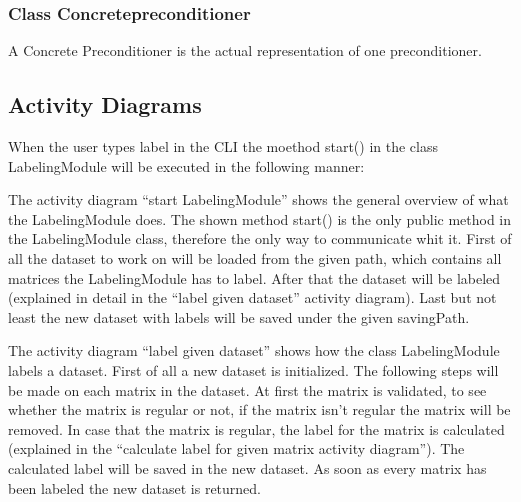 \documentclass[parskip=full]{scrartcl}
\begin{document}
\subsubsection{Class Concrete\gls{preconditioner}}
A Concrete Preconditioner is the actual representation of one \gls{preconditioner}.

\newpage
\subsection{Activity Diagrams}
When the user types label in the \gls{CLI} the moethod start() in the class LabelingModule will be executed in the following manner:

\begin{figure}[h]
\begin{center}

\label{Activity Diagrams}
\end{center}
\end{figure}
\newpage


The activity diagram ``start LabelingModule'' shows the general overview of what the LabelingModule does.
The shown method start() is the only public method in the LabelingModule class, therefore the only way to communicate whit it.
First of all the dataset to work on will be loaded from the given path, which contains all matrices the LabelingModule has to label.
After that the dataset will be labeled (explained in detail in the ``label given dataset'' activity diagram).
Last but not least the new dataset with \glspl{label} will be saved under the given savingPath.


\begin{figure}[h]
\begin{center}

\label{Activity Diagrams}
\end{center}
\end{figure}
\newpage


The activity diagram ``label given dataset'' shows how the class LabelingModule labels a dataset.
First of all a new dataset is initialized.
The following steps will be made on each matrix in the dataset.
At first the matrix is validated, to see whether the matrix is regular or not, if the matrix isn't regular the matrix will be removed.
In case that the matrix is regular, the \gls{label} for the matrix is calculated (explained in the ``calculate label for given matrix activity diagram'').
The calculated \gls{label} will be saved in the new dataset.
As soon as every matrix has been labeled the new dataset is returned.
\end{document}
